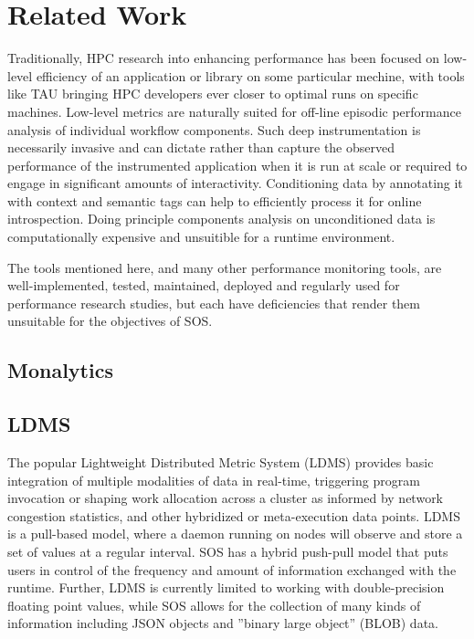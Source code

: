 
\section{Related Work}
%
Traditionally, HPC research into enhancing performance has been
focused on low-level efficiency of an application or library on some
particular mechine, with tools like TAU bringing HPC developers ever
closer to optimal runs on specific machines.
%
Low-level metrics are naturally suited for off-line episodic
performance analysis of individual workflow components.
%
Such deep instrumentation is necessarily invasive and can dictate
rather than capture the observed performance of the instrumented
application when it is run at scale or required to engage in
significant amounts of interactivity.
%
Conditioning data by annotating it with context and semantic tags can
help to efficiently process it for online introspection.
%
Doing principle components analysis on unconditioned data is
computationally expensive and unsuitible for a runtime environment.
%
\par
%
The tools mentioned here, and many other performance monitoring tools, are
well-implemented, tested, maintained, deployed and regularly used for
performance research studies, but each have deficiencies that render them
unsuitable for the objectives of SOS.



\subsection{Monalytics} %
%
%
\subsection{LDMS} %
%
The popular Lightweight Distributed Metric System (LDMS)
\cite{agelastos2014lightweight} provides basic integration of multiple
modalities of data in real-time, triggering program invocation or
shaping work allocation across a cluster as informed by network
congestion statistics, and other hybridized or meta-execution data
points.
%
LDMS is a pull-based model, where a daemon running on nodes will
observe and store a set of values at a regular interval.
%
SOS has a hybrid push-pull model that puts users in control of the
frequency and amount of information exchanged with the runtime.
%
Further, LDMS is currently limited to working with double-precision
floating point values, while SOS allows for the collection of many
kinds of information including JSON objects and ''binary large
object'' (BLOB) data.
%
